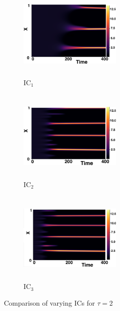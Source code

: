 \begin{figure}[H]
    \centering
    \begin{subfigure}[b]{0.32\textwidth}
        \centering
        \includegraphics[width=5cm,height=4.5cm]{gaff2.png}
        \caption{$\text{IC}_1$}
        \label{}
    \end{subfigure}
    \hfill
    \begin{subfigure}[b]{0.32\textwidth}
        \centering
        \includegraphics[width=5cm,height=4.5cm]{ic22.png}
        \caption{$\text{IC}_2$}
        \label{}
    \end{subfigure}
    \hfill
    \begin{subfigure}[b]{0.32\textwidth}
        \centering
        \includegraphics[width=5cm,height=4.5cm]{ic32.png}
        \caption{$\text{IC}_3$}
        \label{}
    \end{subfigure}
    \caption{Comparison of varying ICs for $\tau=2$}
    \label{fig:figtau2}
\end{figure}
